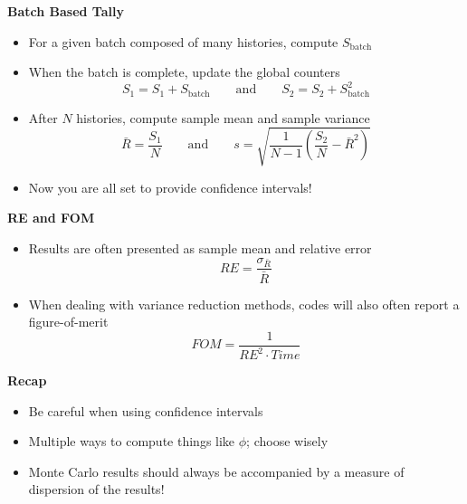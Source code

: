   
\textbf{Batch Based Tally}
  \begin{itemize}
   \item For a given batch composed of many histories, compute $S_{\text{batch}}$
   \item When the batch is complete, update the global counters
   \begin {equation*}
     S_{1} = S_{1} + S_{\text{batch}} \quad\quad \text{and} 
       \quad\quad S_{2} = S_{2} + S_{\text{batch}}^{2}
   \end {equation*}
   \item After $N$ histories, compute sample mean and sample variance
   \begin {equation*}
     \bar{R} = \frac{S_{1}}{N} \quad\quad \text{and}  
     \quad\quad 
     s = \sqrt{\frac{1}{N-1}\left(\frac{S_{2}}{N}-\bar{R}^{2}\right)}
   \end {equation*} 
    \item Now you are all set to provide confidence intervals!
  \end{itemize}
 
\textbf{RE and FOM}
  \begin{itemize}
    \item Results are often presented as sample mean and relative error
      \begin{equation*}
        RE = \frac{\sigma_{\bar{R}}}{\bar{R}}
       \end{equation*}
    \item When dealing with variance reduction methods, codes will 
          also often report a figure-of-merit
    \begin{equation*}
      FOM = \frac{1}{RE^{2}\cdot Time}
    \end{equation*}
  \end{itemize}
 
\textbf{Recap}
  \begin{itemize}
    \item Be careful when using confidence intervals
    \item Multiple ways to compute things like $\phi$; choose wisely
    \item Monte Carlo results should always be 
          accompanied by a measure of dispersion of the results!  
  \end{itemize}
 

